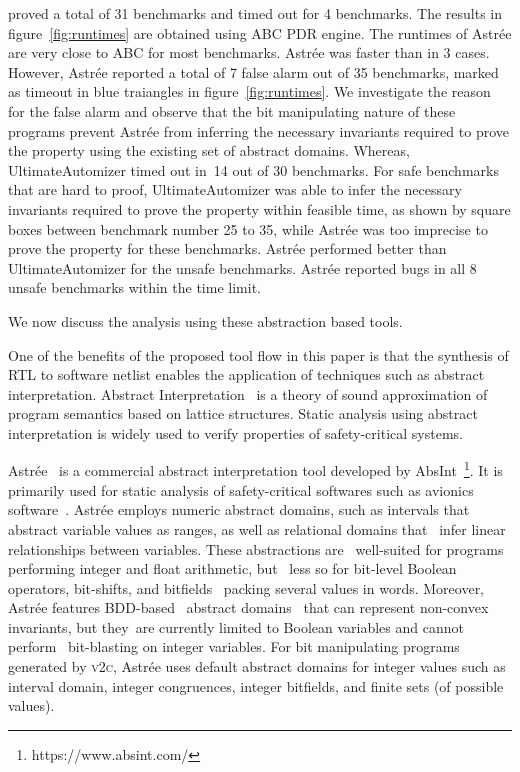 \ABC proved a total of 31 benchmarks and timed out for 4 benchmarks. 
The results in figure~\ref{fig:runtimes} are obtained using ABC PDR engine. 
The runtimes of Astr{\'e}e are very close to ABC for most benchmarks. Astr{\'e}e 
was faster than \ABC in 3 cases.  However, Astr{\'e}e reported a total of 
7 false alarm out of 35 benchmarks, marked as timeout in blue traiangles 
in figure~\ref{fig:runtimes}.  
We investigate the reason for the false alarm and observe 
that the bit manipulating nature of these programs prevent Astr{\'e}e from 
inferring the necessary invariants required to prove the property using the 
existing set of abstract domains.  Whereas, UltimateAutomizer timed out in~14 
out of 30 benchmarks. For safe benchmarks that are hard to proof, UltimateAutomizer 
was able to infer the necessary invariants required to prove the property within 
feasible time, as shown by square boxes between benchmark number 25 to 35, while 
Astr{\'e}e was too imprecise to prove the property for these benchmarks. Astr{\'e}e 
performed better than UltimateAutomizer for the unsafe benchmarks.  Astr{\'e}e 
reported bugs in all 8 unsafe benchmarks within the time limit. 


We now discuss the analysis using these abstraction based tools.

%
One of the benefits of the proposed tool flow in this paper is that the 
synthesis of RTL to software netlist enables the application of techniques 
such as abstract interpretation. Abstract Interpretation~\cite{Cousot92,CC79} is a theory of 
sound approximation of program semantics based on lattice structures. 
Static analysis using abstract interpretation is widely used to verify 
properties of safety-critical systems. 


Astr{\'e}e~\cite{DBLP:conf/esop/CousotCFMMMR05} is a commercial abstract 
interpretation tool developed by AbsInt~\footnote{https://www.absint.com/}.  
It is primarily used for static analysis of safety-critical softwares 
such as avionics software~\cite{DBLP:journals/corr/abs-cs-0701193}.
Astr{\'e}e employs numeric abstract domains, such as intervals that  
abstract variable values as ranges, as well as relational domains that  
infer linear relationships between variables. These abstractions are  
well-suited for programs performing integer and float arithmetic, but  
less so for bit-level Boolean operators, bit-shifts, and bitfields  
packing several values in words.  Moreover, Astr{\'e}e features BDD-based  
abstract domains~\cite{bdd-domain} that can represent non-convex invariants, 
but they are currently limited to Boolean variables and cannot perform  
bit-blasting on integer variables.  For bit manipulating programs 
generated by \textsc{v2c}, Astr{\'e}e uses default abstract domains 
for integer values such as interval domain, integer congruences, 
integer bitfields, and finite sets (of possible values).


